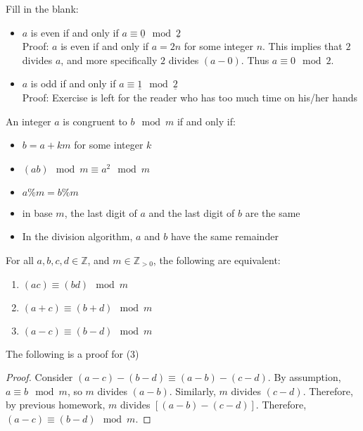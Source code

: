 \begin{example}
Fill in the blank: 
\begin{itemize}
\item $a$ is even if and only if $a \equiv \underline{0} \mod {\underline{2}}$ \\
\indent Proof: $a$ is even if and only if $a = 2n$ for some integer $n$. This implies that $2$ divides $a$, and more specifically $2$ divides $(a - 0)$. Thus $a \equiv 0 \mod{2}$. 
\item $a$ is odd if and only if $a \equiv \underline{1} \mod {\underline{2}}$ \\
\indent Proof: Exercise is left for the reader who has too much time on his/her hands
\end{itemize}
\end{example}

\begin{example}
An integer $a$ is congruent to $b \mod{m}$ if and only if:
\begin{itemize} 
\item $b = a + km$ for some integer $k$
\item $(ab) \mod{m} \equiv a^2 \mod{m}$
\item $a \% m = b \% m$
\item in base $m$, the last digit of $a$ and the last digit of $b$ are the same
\item In the division algorithm, $a$ and $b$ have the same remainder 
\end{itemize}
\end{example}

\begin{theorem}
For all $a, b, c, d \in \mathbb{Z}$, and $m \in \mathbb{Z}_{>0}$, the following are equivalent:

\begin{enumerate}
\item $(ac) \equiv (bd) \mod{m}$
\item $(a + c) \equiv (b + d) \mod{m}$
\item $(a - c) \equiv (b - d) \mod{m}$
\end{enumerate}{}
\end{theorem}

The following is a proof for (3)
\begin{proof}
Consider $(a - c) - (b - d) \equiv (a - b) - (c - d)$. By assumption, $a \equiv b \mod{m}$, so $m$ divides $(a - b)$. Similarly, $m$ divides $(c - d)$. Therefore, by previous homework, $m$ divides $[(a - b) - (c - d)]$. Therefore, $(a - c) \equiv (b - d) \mod{m}$.
\end{proof}

